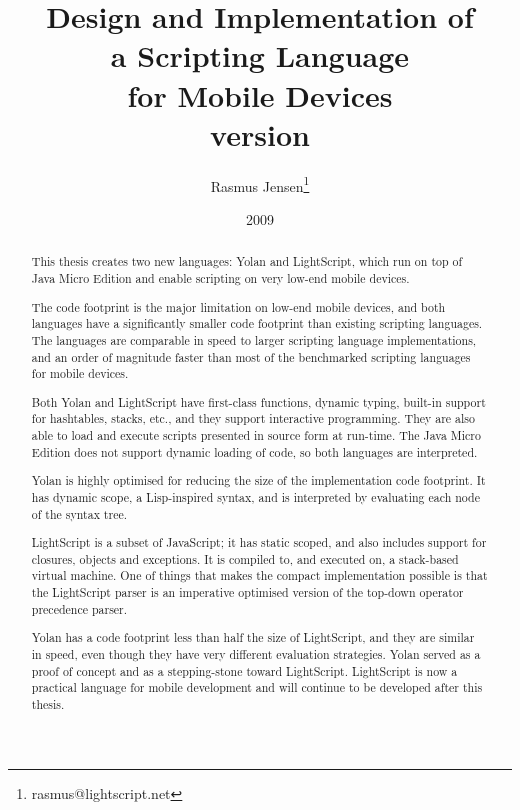 \documentclass[11pt]{report}
\title{
Design and Implementation of \\
a Scripting Language \\ 
for Mobile Devices \\
{\scriptsize version }}
\author{
  Rasmus Jensen\footnote{
    rasmus@lightscript.net
  }
}
\date{2009}
\begin{document}
\maketitle
\renewcommand\abstractname{Abstract}
\begin{abstract}
This thesis creates two new languages: Yolan and LightScript, which run on top of Java Micro Edition and enable scripting on very low-end mobile devices.

The code footprint is the major limitation on low-end mobile devices, and both languages have a significantly smaller code footprint than existing scripting languages. 
The languages are comparable in speed to larger scripting language implementations,
and an order of magnitude faster than most of the benchmarked scripting languages for mobile devices.

Both Yolan and LightScript have first-class functions, dynamic typing, built-in support for hashtables, stacks, etc., and they support interactive programming. They are also able to load and execute scripts presented in source form at run-time. 
The Java Micro Edition does not support dynamic loading of code, so both languages are interpreted.

Yolan is highly optimised for reducing the size of the implementation code footprint. It has dynamic scope, a Lisp-inspired syntax, and is interpreted by evaluating each node of the syntax tree. 

LightScript is a subset of JavaScript; it has static scoped, and also includes support for closures, objects and exceptions. It is compiled to, and executed on, a stack-based virtual machine. One of things that makes the compact implementation possible is that the LightScript parser is an imperative optimised version of the top-down operator precedence parser.

Yolan has a code footprint less than half the size of LightScript, and they are similar in speed, even though they have very different evaluation strategies.
Yolan served as a proof of concept and as a stepping-stone toward LightScript. 
LightScript is now a practical language for mobile development and will continue to be developed after this thesis.
\end{abstract}
\end{document}
